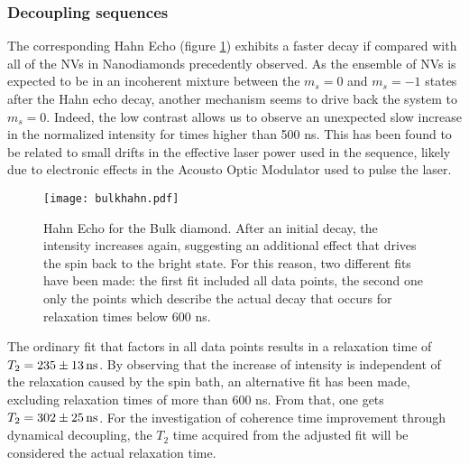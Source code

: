 \documentclass[12pt,a4paper]{article}
\begin{document}
\subsubsection{Decoupling sequences}  
The corresponding Hahn Echo (figure \ref{bh}) exhibits a faster decay if compared with all of the NVs in Nanodiamonds precedently observed.
As the ensemble of NVs is expected to be in an incoherent mixture between the $m_s=0$ and $m_s=-1$ states after the Hahn echo decay, another mechanism seems to drive back the system to $m_s=0$. Indeed, the low contrast allows us to observe an unexpected slow increase in the normalized intensity for times higher than 500 ns. This has been found to be related to small drifts in the effective laser power used in the sequence, likely due to electronic effects in the Acousto Optic Modulator used to pulse the laser. 
\begin{figure}[H]
\texttt{[image: bulkhahn.pdf]} 
\caption{Hahn Echo for the Bulk diamond. After an initial decay, the intensity increases again, suggesting an additional effect that drives the spin back to the bright state. For this reason, two different fits have been made: the first fit included all data points, the second one only the points which describe the actual decay that occurs for relaxation times below 600 ns.}
\label{bh}
\end{figure}
The ordinary fit that factors in all data points results in a relaxation time of $T_2=\unit[235\pm 13]{ns}$. By observing that the increase of intensity is independent of the relaxation caused by the spin bath, an alternative fit has been made, excluding relaxation times of more than 600 ns. From that, one gets $T_2=\unit[302\pm 25]{ns}$. For the investigation of coherence time improvement through dynamical decoupling, the $T_2$ time acquired from the adjusted fit will be considered the actual relaxation time.
\end{document}
